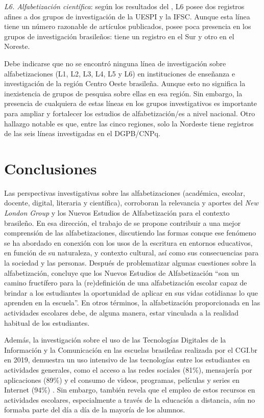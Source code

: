 \documentclass{textolivre}
\begin{document}
\textit{L6. Alfabetización científica}: según los resultados del , L6 posee dos registros afines a dos grupos de investigación de la UESPI y la IFSC. Aunque esta línea tiene un número razonable de artículos publicados, posee poca presencia en los grupos de investigación brasileños: tiene un registro en el Sur y otro en el Noreste. 

Debe indicarse que no se encontró ninguna línea de investigación sobre alfabetizaciones (L1, L2, L3, L4, L5 y L6) en instituciones de enseñanza e investigación de la región Centro Oeste brasileña. Aunque esto no significa la inexistencia de grupos de pesquisa sobre ellas en esa región. Sin embargo, la presencia de cualquiera de estas líneas en los grupos investigativos es importante para ampliar y fortalecer los estudios de alfabetización/es a nivel nacional. Otro hallazgo notable es que, entre las cinco regiones, solo la Nordeste tiene registros de las seis líneas investigadas en el DGPB/CNPq.

\section{Conclusiones}\label{sec-conclusiones}
Las perspectivas investigativas sobre las alfabetizaciones (académica, escolar, docente, digital, literaria y científica), corroboran la relevancia y aportes del \textit{New London Group} y los Nuevos Estudios de Alfabetización para el contexto brasileño. En esa dirección, el trabajo de \textcite{terra_letramento_2013} se propone contribuir a una mejor comprensión de las alfabetizaciones, discutiendo las formas conque ese fenómeno se ha abordado en conexión con los usos de la escritura en entornos educativos, en función de su naturaleza, y contexto cultural, así como sus consecuencias para la sociedad y las personas. Después de problematizar algunas cuestiones sobre la alfabetización, \textcite[p. 29]{terra_letramento_2013} concluye que los Nuevos Estudios de Alfabetización “son un camino fructífero para la (re)definición de una alfabetización escolar capaz de brindar a los estudiantes la oportunidad de aplicar en sus vidas cotidianas lo que aprenden en la escuela”. En otros términos, la alfabetización proporcionada en las actividades escolares debe, de alguna manera, estar vinculada a la realidad habitual de los estudiantes.

Además, la investigación sobre el uso de las Tecnologías Digitales de la Información y la Comunicación en las escuelas brasileñas realizada por el CGI.br en 2019, demuestra un uso intensivo de las tecnologías entre los estudiantes en actividades generales, como el acceso a las redes sociales (81\%), mensajería por aplicaciones (89\%) y el consumo de videos, programas, películas y series en Internet (94\%) \cite{comite_gestor_da_internet_no_brasil_resumo_2019}. Sin embargo, también revela que el empleo de estos recursos en actividades escolares, especialmente a través de la educación a distancia, aún no formaba parte del día a día de la mayoría de los alumnos. 
\end{document}

